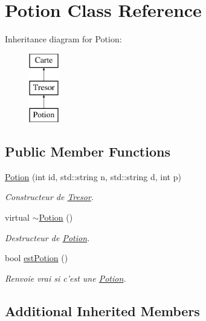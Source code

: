 \hypertarget{class_potion}{\section{Potion Class Reference}
\label{class_potion}
}
Inheritance diagram for Potion\-:\begin{figure}[H]
\begin{center}
\leavevmode
\includegraphics[height=3.000000cm]{class_potion}
\end{center}
\end{figure}
\subsection*{Public Member Functions}
\begin{DoxyCompactItemize}
\item 
\hyperlink{class_potion_a6a6ade33a2c7c7502168594be6c15747}{Potion} (int id, std\-::string n, std\-::string d, int p)
\begin{DoxyCompactList}\small\item\em Constructeur de \hyperlink{class_tresor}{Tresor}. \end{DoxyCompactList}\item 
\hypertarget{class_potion_a8730c8052ec698171885bb5dacda9cca}{virtual \hyperlink{class_potion_a8730c8052ec698171885bb5dacda9cca}{$\sim$\-Potion} ()}\label{class_potion_a8730c8052ec698171885bb5dacda9cca}

\begin{DoxyCompactList}\small\item\em Destructeur de \hyperlink{class_potion}{Potion}. \end{DoxyCompactList}\item 
bool \hyperlink{class_potion_aa04fc4873583e7b1f90416b226edbe06}{est\-Potion} ()
\begin{DoxyCompactList}\small\item\em Renvoie vrai si c'est une \hyperlink{class_potion}{Potion}. \end{DoxyCompactList}\end{DoxyCompactItemize}
\subsection*{Additional Inherited Members}


